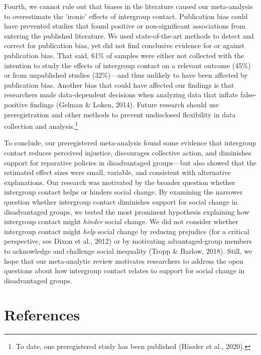 \documentclass[12pt, letterpaper]{article}
\begin{document}
Fourth, we cannot rule out that biases in the literature caused our
meta-analysis to overestimate the `ironic' effects of intergroup
contact. Publication bias could have prevented studies that found
positive or non-significant associations from entering the published
literature. We used state-of-the-art methods to detect and correct for
publication bias, yet did not find conclusive evidence for or against
publication bias. That said, 61\% of samples were either not collected
with the intention to study the effects of intergroup contact on a
relevant outcome (45\%) or from unpublished studies (32\%)---and thus
unlikely to have been affected by publication bias. Another bias that
could have affected our findings is that researchers made data-dependent
decisions when analyzing data that inflate false-positive findings
(Gelman \& Loken, 2014). Future research should use preregistration and
other methods to prevent undisclosed flexibility in data collection and
analysis.\footnote{To date, one preregistered study has been published
  (Hässler et al., 2020).}

To conclude, our preregistered meta-analysis found some evidence that
intergroup contact reduces perceived injustice, discourages collective
action, and diminishes support for reparative policies in disadvantaged
groups---but also showed that the estimated effect sizes were small,
variable, and consistent with alternative explanations. Our research was
motivated by the broader question whether intergroup contact helps or
hinders social change. By examining the narrower question whether
intergroup contact diminishes support for social change in disadvantaged
groups, we tested the most prominent hypothesis explaining how
intergroup contact might \emph{hinder} social change. We did not
consider whether intergroup contact might \emph{help} social change by
reducing prejudice (for a critical perspective, see Dixon et al., 2012)
or by motivating advantaged-group members to acknowledge and challenge
social inequality (Tropp \& Barlow, 2018). Still, we hope that our
meta-analytic review motivates researchers to address the open questions
about how intergroup contact relates to support for social change in
disadvantaged groups.

\newpage

\hypertarget{references}{%
\section{References}\label{references}}
\end{document}
